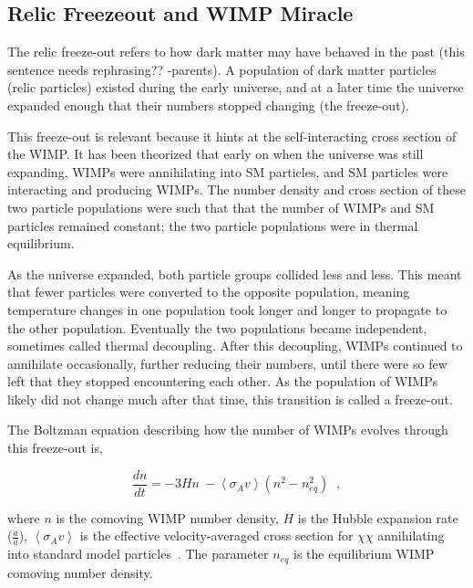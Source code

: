 \subsection{Relic Freezeout and WIMP Miracle}

The relic freeze-out refers to how dark matter may have behaved in the past {\color{red}(this sentence needs rephrasing?? -parents)}.
A population of dark matter particles (relic particles) existed during the early universe, and at a later time the universe expanded enough that their numbers stopped changing (the freeze-out).

This freeze-out is relevant because it hints at the self-interacting cross section of the WIMP.
It has been theorized that early on when the universe was still expanding, WIMPs were annihilating into SM particles, and SM particles were interacting and producing WIMPs.
The number density and cross section of these two particle populations were such that that the number of WIMPs and SM particles remained constant; the two particle populations were in thermal equilibrium.

As the universe expanded, both particle groups collided less and less.
This meant that fewer particles were converted to the opposite population, meaning temperature changes in one population took longer and longer to propagate to the other population.
Eventually the two populations became independent, sometimes called thermal decoupling.
After this decoupling, WIMPs continued to annihilate occasionally, further reducing their numbers, until there were so few left that they stopped encountering each other.
As the population of WIMPs likely did not change much after that time, this transition is called a freeze-out.

The Boltzman equation describing how the number of WIMPs evolves through this freeze-out is,

\begin{equation}\label{eqn:boltzmann_relic}
  \frac{dn}{dt} = - 3 H n \: - \left \langle \sigma_{A} v \right \rangle \left ( n^2 - n_{eq}^2 \right ) \;\;,
\end{equation}

where $n$ is the comoving WIMP number density, $H$ is the Hubble expansion rate ($\frac{\dot{a}}{a}$), $\left \langle \sigma_{A} v \right \rangle$ is the effective velocity-averaged cross section for $\chi\chi$ annihilating into standard model particles~\cite{wells_relic}.
The parameter $n_{eq}$ is the equilibrium WIMP comoving number density.

